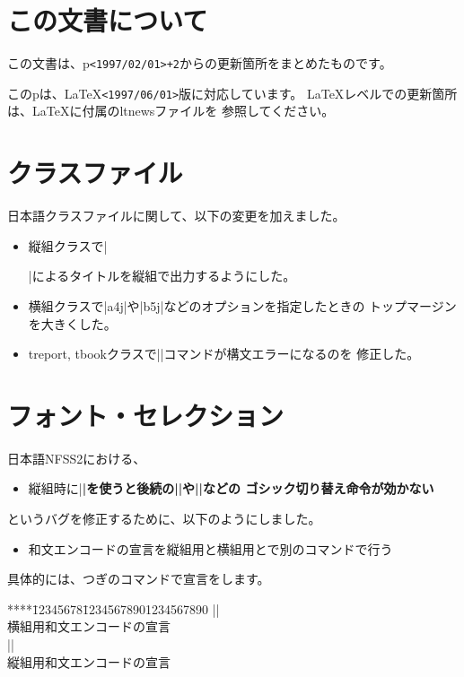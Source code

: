 \documentclass{plnews}
\author{中野 賢（\texttt{<ken-na at ascii.co.jp>}）
        \& 富樫 秀昭（\texttt{<hideak-t at ascii.co.jp>}）
}
\begin{document}
\maketitle

\section{この文書について}
この文書は、p\LaTeXe{}\texttt{<1997/02/01>+2}からの更新箇所をまとめたものです。

このp\LaTeXe{}は、\LaTeX{}\texttt{<1997/06/01>}版に対応しています。
\LaTeX{}レベルでの更新箇所は、\LaTeX{}に付属のltnewsファイルを
参照してください。

\section{クラスファイル}
日本語クラスファイルに関して、以下の変更を加えました。

\begin{itemize}
\item 縦組クラスで|\maketitle|によるタイトルを縦組で出力するようにした。
\item 横組クラスで|a4j|や|b5j|などのオプションを指定したときの
  トップマージンを大きくした。
\item treport, tbookクラスで|\thefigure|コマンドが構文エラーになるのを
  修正した。
\end{itemize}

\section{フォント・セレクション}
日本語NFSS2における、
\begin{itemize}
\item 縦組時に|\bfseries|を使うと後続の|\textgt|や|\gtfamily|などの
  ゴシック切り替え命令が効かない
\end{itemize}
というバグを修正するために、以下のようにしました。
\begin{itemize}
\item 和文エンコードの宣言を縦組用と横組用とで別のコマンドで行う
\end{itemize}
具体的には、つぎのコマンドで宣言をします。

\begin{tabbing}
****\=12345678\=12345678901234567890\kill
\>|\DeclareYokoKanjiEncoding|\\
\> \> 横組用和文エンコードの宣言\\
\>|\DeclareTateKanjiEncoding|\\
\> \> 縦組用和文エンコードの宣言\\
\end{tabbing}
\end{document}
